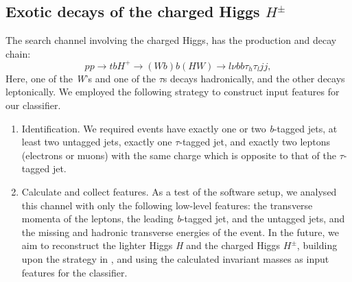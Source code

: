 {\subsection{Exotic decays of the charged Higgs $H^\pm$}\label{subsec:Hpm_analysis}
The search channel involving the charged Higgs, has the production and decay chain: 
\[pp\rightarrow tbH^+\rightarrow (Wb)b(HW)\rightarrow l\nu bb\tau_h\tau_ljj,\]
Here, one of the \emph{W}'s and one of the $\tau$s decays hadronically, and the other decays leptonically.
We employed the following strategy to construct input features for our classifier. 
\begin{enumerate}
  \item {Identification}. We required events have exactly one or two \emph{b}-tagged jets, at least two untagged jets, exactly one $\tau$-tagged jet, and exactly two leptons (electrons or muons) with the same charge which is opposite to that of the $\tau$-tagged jet.
  \item{Calculate and collect features}. As a test of the software setup, we analysed this channel with only the following low-level features: the transverse momenta of the leptons, the leading \emph{b}-tagged jet, and the untagged jets, and the missing and hadronic transverse energies of the event. In the future, we aim to reconstruct the lighter Higgs \emph{H} and the charged Higgs $H^\pm$, building upon the strategy in \cite{Coleppa2014a}, and using the calculated invariant masses as input features for the classifier.
\end{enumerate}

}
